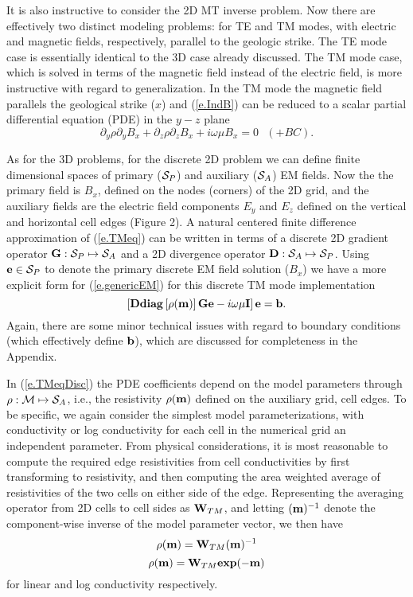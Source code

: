 It is also instructive to consider the
2D MT inverse problem.  Now there are effectively two distinct
modeling problems: for TE and TM modes, with
electric and magnetic fields, respectively, parallel
to the geologic strike.
The TE mode case is essentially identical to the 3D case already
discussed.  
The TM mode case, which is solved in terms of the magnetic field
instead of the electric field, is more instructive
with regard to generalization.
In the TM mode the magnetic field parallels
the geological strike ($x$) and (\ref{e.IndB}) can
be reduced to a scalar partial differential 
equation (PDE) in the $y-z$ plane
\begin{equation}
\label{e.TMeq}
\partial_y \rho \partial_y B_x + \partial_z \rho
\partial_z B_x +  i \omega \mu B_x = 0 \,\,\,\, (+BC) .
\end{equation}

As for the 3D problems, for the discrete 2D problem we can define
finite dimensional spaces of primary (${\cal S}_P$)
and auxiliary (${\cal S}_A$) EM fields.  Now the the primary
field is $B_x$, defined on the nodes (corners) of the 2D grid,
and the auxiliary fields are the electric field components
$E_y$ and $E_z$ defined on the vertical and horizontal
cell edges (Figure 2).  A natural centered finite difference approximation
of (\ref{e.TMeq}) can be written in terms of a discrete
2D gradient operator ${\bf G}:{\cal S}_P \mapsto {\cal S}_A$
and a 2D divergence operator ${\bf D}:{\cal S}_A \mapsto{\cal S}_P$.
Using ${\bf e} \in {\cal S}_P$ to denote the primary
discrete EM field solution ($B_x$) we have a more explicit
form for (\ref{e.genericEM}) for this discrete
TM mode implementation
\begin{equation}
\label{e.TMeqDisc}
\left [
{\bf D} {\bf diag } \left[
\rho({\bf m}) \right]  {\bf G} {\bf e} -  i\omega\mu{\bf I} \right] {\bf e} = {\bf b} .
\end{equation}
Again, there are some minor technical issues with
regard to boundary conditions (which effectively define ${\bf b}$),
which are discussed for completeness in the Appendix.

In (\ref{e.TMeqDisc}) the PDE coefficients depend on the
model parameters through $\rho : {\cal M} \mapsto {\cal S}_A$,
i.e., the resistivity $\rho({\bf m})$ defined on the auxiliary
grid, cell edges.  To be specific,
we again consider the simplest model parameterizations,
with conductivity or log conductivity for each cell
in the numerical grid an independent parameter.
From physical considerations, it is most reasonable to
compute the required edge resistivities from cell conductivities
by first transforming to resistivity,
and then computing the area weighted average of resistivities
of the two cells on either side of the edge.  Representing the
averaging operator from 2D cells to cell sides as ${\bf W}_{TM}$,
and letting $({\bf m})^{-1}$ denote the
component-wise inverse of the model parameter vector,
we then have
\begin{equation}
\label{e.WTMlin}
\rho({\bf m}) = {\bf W}_{TM} ({\bf m})^{-1}
\end{equation}
\begin{equation}
\rho({\bf m}) = {\bf W}_{TM} {\bf exp}(-{\bf m})
\end{equation}
for linear and log conductivity respectively.

